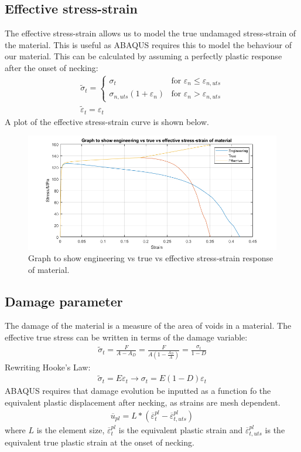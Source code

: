 \documentclass[11pt]{article}
\numberwithin{equation}{section}
\begin{document}
\subsection{Effective stress-strain}
The effective stress-strain allows us to model the true undamaged stress-strain of the material. This is useful as ABAQUS requires this to model the behaviour of our material. This can be calculated by assuming a perfectly plastic response after the onset of necking:
\begin{gather}
    \widetilde{\sigma}_t = \begin{cases}
        \sigma_t & \textrm{for } \varepsilon_n \leq \varepsilon_{n,uts}\\
        \sigma_{n,uts}\left(1 + \varepsilon_n\right) & \textrm{for } \varepsilon_n > \varepsilon_{n,uts}
    \end{cases}\\
    \widetilde{\varepsilon}_t = \varepsilon_t
\end{gather}
A plot of the effective stress-strain curve is shown below.
\begin{figure}[H]
    \centering
    \includegraphics[width = \textwidth]{./img/engVsTrueVsEffectiveStressStrain.png}
    \caption{Graph to show engineering vs true vs effective stress-strain response of material.}
    \label{engVsTrueVsEffectiveStressStrainCurve}
\end{figure}
\subsection{Damage parameter}
The damage of the material is a measure of the area of voids in a material. The effective true stress can be written in terms of the damage variable:
\begin{align}
    \widetilde{\sigma}_t = \frac{F}{A-A_D} = \frac{F}{A\left(1 - \frac{A_D}{A}\right)} = \frac{\sigma_t}{1 - D}
\end{align}
Rewriting Hooke's Law:
\begin{gather}
    \widetilde{\sigma}_t = E \varepsilon_t \rightarrow \sigma_t = E\left(1-D\right)\varepsilon_t
\end{gather}
ABAQUS requires that damage evolution be inputted as a function fo the equivalent plastic displacement after necking, as strains are mesh dependent.
\begin{gather}
    \overline{u}_{pl} = L*\left(\overline{\varepsilon}^{pl}_t - \overline{\varepsilon}^{pl}_{t,uts}\right)
\end{gather}
where $L$ is the element size, $\overline{\varepsilon}^{pl}_t$ is the equivalent plastic strain and $\overline{\varepsilon}^{pl}_{t,uts}$ is the equivalent true plastic strain at the onset of necking. 
\end{document}
